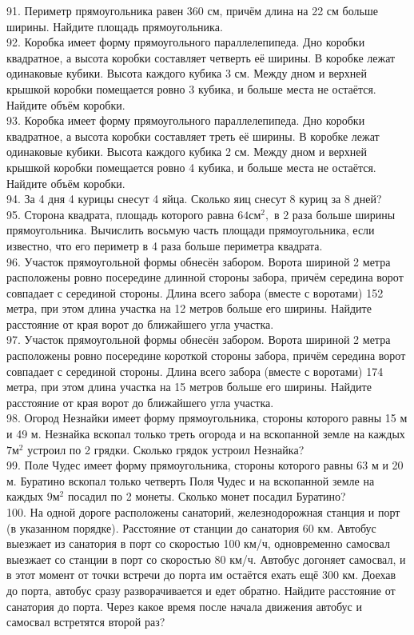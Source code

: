 \documentclass[12pt]{article}
\begin{document}
91. Периметр прямоугольника равен 360 см, причём длина на 22 см больше ширины. Найдите площадь прямоугольника.\\
92. Коробка имеет форму прямоугольного параллелепипеда. Дно коробки квадратное, а высота коробки составляет четверть её ширины. В коробке лежат одинаковые кубики. Высота каждого кубика 3 см. Между дном и верхней крышкой коробки помещается ровно 3 кубика, и больше места не остаётся. Найдите объём коробки.\\
93. Коробка имеет форму прямоугольного параллелепипеда. Дно коробки квадратное, а высота коробки составляет треть её ширины. В коробке лежат одинаковые кубики. Высота каждого кубика 2 см. Между дном и верхней крышкой коробки помещается ровно 4 кубика, и больше места не остаётся. Найдите объём коробки.\\
94. За 4 дня 4 курицы снесут 4 яйца. Сколько яиц снесут 8 куриц за 8 дней?\\
95. Сторона квадрата, площадь которого равна $64\text{см}^2,$ в 2 раза больше ширины прямоугольника. Вычислить восьмую часть площади прямоугольника, если известно, что его периметр в 4 раза больше периметра квадрата.\\
96. Участок прямоугольной формы обнесён забором. Ворота шириной 2 метра расположены ровно посередине длинной стороны забора, причём середина ворот совпадает с серединой стороны. Длина всего забора (вместе с воротами) 152 метра, при этом длина участка на 12 метров больше его ширины. Найдите расстояние от края ворот до ближайшего угла участка.\\
97. Участок прямоугольной формы обнесён забором. Ворота шириной 2 метра расположены ровно посередине короткой стороны забора, причём середина ворот совпадает с серединой стороны. Длина всего забора (вместе с воротами) 174 метра, при этом длина участка на 15 метров больше его ширины. Найдите расстояние от края ворот до ближайшего угла участка.\\
98. Огород Незнайки имеет форму прямоугольника, стороны которого равны 15 м и 49 м. Незнайка вскопал только треть огорода и на вскопанной земле на каждых
$7\text{м}^2$ устроил по 2 грядки. Сколько грядок устроил Незнайка?\\
99. Поле Чудес имеет форму прямоугольника, стороны которого равны 63 м и 20 м. Буратино вскопал только четверть Поля Чудес и на вскопанной земле на каждых
$9\text{м}^2$ посадил по 2 монеты. Сколько монет посадил Буратино?\\
100. На одной дороге расположены санаторий, железнодорожная станция и порт (в указанном порядке). Расстояние от станции до санатория 60 км. Автобус выезжает из санатория в порт со скоростью 100 км/ч, одновременно самосвал выезжает со станции в порт со скоростью 80 км/ч. Автобус догоняет самосвал, и в этот момент от точки встречи до порта им остаётся ехать ещё 300 км. Доехав до порта, автобус сразу разворачивается и едет обратно. Найдите расстояние от санатория до порта. Через какое время после начала движения автобус и самосвал встретятся второй раз?\\
\end{document}

